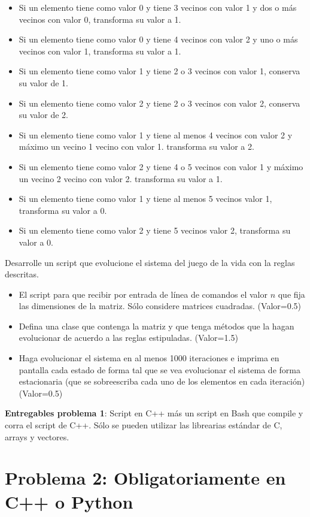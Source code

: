 \documentclass[10.5pt]{article}
\begin{document}
\begin{itemize}
\item Si un elemento tiene como valor 0 y tiene 3 vecinos con valor 1 y dos o más vecinos con valor 0, transforma su valor a 1.
\item Si un elemento tiene como valor 0 y tiene 4 vecinos con valor 2 y uno o más vecinos con valor 1, transforma su valor a 1.
\item Si un elemento tiene como valor 1 y tiene 2 o 3 vecinos con valor 1, conserva su valor de 1.
\item Si un elemento tiene como valor 2 y tiene 2 o 3 vecinos con valor 2, conserva su valor de 2.
\item Si un elemento tiene como valor 1 y tiene al menos 4 vecinos con valor 2 y máximo un vecino 1 vecino con valor 1. transforma su valor a 2. 
\item Si un elemento tiene como valor 2 y tiene 4 o 5 vecinos con valor 1 y máximo un vecino 2 vecino con valor 2. transforma su valor a 1.
\item Si un elemento tiene como valor 1 y tiene al menos 5 vecinos valor 1, transforma su valor a 0.
\item Si un elemento tiene como valor 2 y tiene 5 vecinos valor 2, transforma su valor a 0.
\end{itemize}

Desarrolle un script que evolucione el sistema del juego de la vida con la reglas descritas. 

\begin{itemize}
\item El script para que recibir por entrada de l\'{i}nea de comandos el valor $n$ que fija las dimensiones de la matriz. Sólo considere matrices cuadradas. (Valor=0.5)
\item Defina una clase que contenga la matriz y que tenga métodos que la hagan evolucionar de acuerdo a las reglas estipuladas. (Valor=1.5)
\item Haga evolucionar el sistema en al menos 1000 iteraciones e imprima en pantalla cada estado de forma tal que se vea evolucionar el sistema de forma estacionaria (que se sobreescriba cada uno de los elementos en cada iteración) (Valor=0.5)
\end{itemize}

{\bf Entregables problema 1}: Script en C++ más un script en Bash que compile y corra el script de C++. Sólo se pueden utilizar las librearias estándar de C, arrays y vectores.

\section{Problema 2: Obligatoriamente en C++ o Python}
\end{document}
